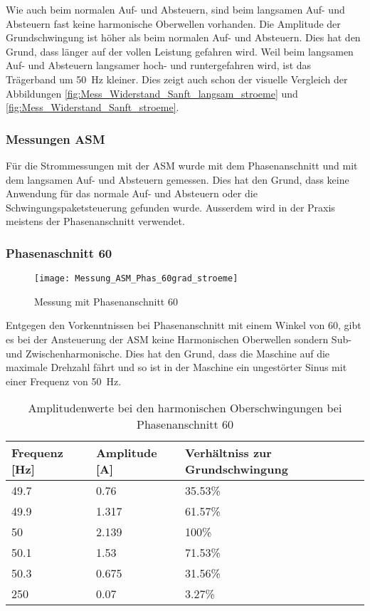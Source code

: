 Wie auch beim normalen Auf- und Absteuern, sind beim langsamen Auf- und Absteuern fast keine harmonische Oberwellen vorhanden. Die Amplitude der Grundschwingung ist höher als beim normalen Auf- und Absteuern. Dies hat den Grund, dass länger auf der vollen Leistung gefahren wird. Weil beim langsamen Auf- und Absteuern langsamer hoch- und runtergefahren wird, ist das Trägerband um \SI{50}{Hz} kleiner. Dies zeigt auch schon der visuelle Vergleich der Abbildungen \ref{fig:Mess_Widerstand_Sanft_langsam_stroeme} und \ref{fig:Mess_Widerstand_Sanft_stroeme}.



\newpage
\subsubsection{Messungen ASM}
Für die Strommessungen mit der ASM wurde mit dem Phasenanschnitt und mit dem langsamen Auf- und Absteuern gemessen. Dies hat den Grund, dass keine Anwendung für das normale Auf- und Absteuern oder die Schwingungspaketsteuerung gefunden wurde. Ausserdem wird in der Praxis meistens der Phasenanschnitt verwendet. 
\subsubsection*{Phasenaschnitt 60\textdegree}
\begin{figure}[ht!]
	\centering
	\texttt{[image: Messung\_ASM\_Phas\_60grad\_stroeme]}	
	\caption{Messung mit Phasenanschnitt 60\textdegree}\label{fig:Mess_Phas_60grad_stroeme}
\end{figure}
Entgegen den Vorkenntnissen bei Phasenanschnitt mit einem Winkel von 60\textdegree, gibt es bei der Ansteuerung der ASM keine Harmonischen Oberwellen sondern Sub- und Zwischenharmonische. Dies hat den Grund, dass die Maschine auf die maximale Drehzahl fährt und so ist in der Maschine ein ungestörter Sinus mit einer Frequenz von \SI{50}{Hz}.

\begin{table}[ht!]
	\centering
	\begin{tabular}{|l|l|l|}
		\hline
		Frequenz {[}Hz{]} & Amplitude {[}A{]} & Verhältniss zur Grundschwingung	\\ \hline
		49.7              & 0.76              & 35.53\%							\\ \hline
		49.9              & 1.317             & 61.57\%							\\ \hline
		50                & 2.139             & 100\%							\\ \hline
		50.1              & 1.53              & 71.53\%							\\ \hline
		50.3              & 0.675             & 31.56\%							\\ \hline
		250               & 0.07              & 3.27\%							\\ \hline
	\end{tabular}
	\caption{Amplitudenwerte bei den harmonischen Oberschwingungen bei Phasenanschnitt 60\textdegree}\label{tab:Phas_60_ASM_stroeme}
\end{table}



